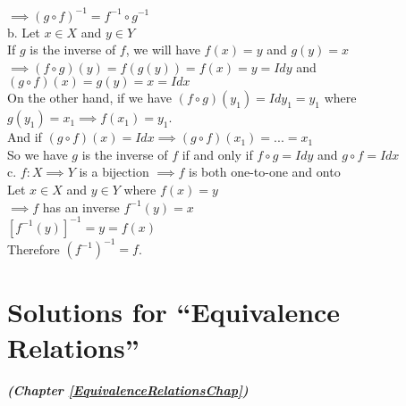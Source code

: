 $\implies (g\circ f)^{-1}=f^{-1}\circ g^{-1}$\\
b. Let $x\in X$ and $y\in Y$\\
If $g$ is the inverse of $f$, we will have $f(x)=y$ and $g(y)=x$\\
$\implies (f\circ g)(y)=f(g(y))=f(x)=y=Idy$ and $(g\circ f)(x)=g(y)=x=Idx$\\
On the other hand, if we have $(f\circ g)(y_1)=Idy_1=y_1$ where $g(y_1)=x_1 \implies f(x_1)=y_1$.\\
And if $(g\circ f)(x)=Idx \implies (g\circ f)(x_1)=...=x_1$\\
So we have $g$ is the inverse of $f$ if and only if $f\circ g=Idy$ and $g\circ f=Idx$\\
c. $f: X\implies Y$ is a bijection $\implies f$ is both one-to-one and onto\\
Let $x\in X$ and $y\in Y$ where $f(x)=y$\\
$\implies f$ has an inverse $f^{-1}(y)=x$\\
$[f^{-1}(y)]^{-1}=y=f(x)$\\
Therefore $(f^{-1})^{-1}=f$.\\

\section{Solutions for  ``Equivalence Relations''}
\noindent\textbf{\textit{ (Chapter \ref{EquivalenceRelationsChap})}}\bigskip

